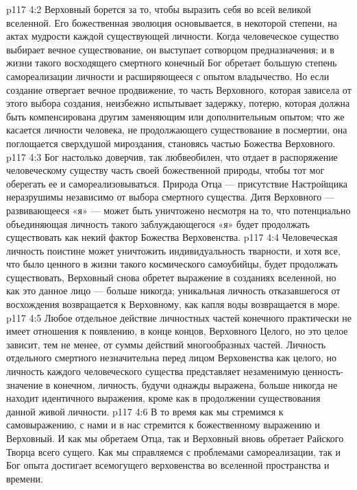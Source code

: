 \vs p117 4:2 Верховный борется за то, чтобы выразить себя во всей великой вселенной. Его божественная эволюция основывается, в некоторой степени, на актах мудрости каждой существующей личности. Когда человеческое существо выбирает вечное существование, он выступает сотворцом предназначения; и в жизни такого восходящего смертного конечный Бог обретает большую степень самореализации личности и расширяющееся с опытом владычество. Но если создание отвергает вечное продвижение, то часть Верховного, которая зависела от этого выбора создания, неизбежно испытывает задержку, потерю, которая должна быть компенсирована другим заменяющим или дополнительным опытом; что же касается личности человека, не продолжающего существование в посмертии, она поглощается сверхдушой мироздания, становясь частью Божества Верховного.
\vs p117 4:3 Бог настолько доверчив, так любвеобилен, что отдает в распоряжение человеческому существу часть своей божественной природы, чтобы тот мог оберегать ее и самореализовываться. Природа Отца --- присутствие Настройщика неразрушимы независимо от выбора смертного существа. Дитя Верховного --- развивающееся «я» --- может быть уничтожено несмотря на то, что потенциально объединяющая личность такого заблуждающегося «я» будет продолжать существовать как некий фактор Божества Верховенства.
\vs p117 4:4 Человеческая личность поистине может уничтожить индивидуальность тварности, и хотя все, что было ценного в жизни такого космического самоубийцы, будет продолжать существовать,  Верховный снова обретет выражение в созданиях вселенной, но как это данное лицо --- больше никогда; уникальная личность отказавшегося от восхождения возвращается к Верховному, как капля воды возвращается в море.
\vs p117 4:5 Любое отдельное действие личностных частей конечного практически не имеет отношения к появлению, в конце концов, Верховного Целого, но это целое зависит, тем не менее, от суммы действий многообразных частей. Личность отдельного смертного незначительна перед лицом Верховенства как целого, но личность каждого человеческого существа представляет незаменимую ценность\hyp{}значение в конечном, личность, будучи однажды выражена, больше никогда не находит идентичного выражения, кроме как в продолжении существования данной живой личности.
\vs p117 4:6 В то время как мы стремимся к самовыражению, с нами и в нас стремится к божественному выражению и Верховный. И как мы обретаем Отца, так и Верховный вновь обретает Райского Творца всего сущего. Как мы справляемся с проблемами самореализации, так и Бог опыта достигает всемогущего верховенства во вселенной пространства и времени.
